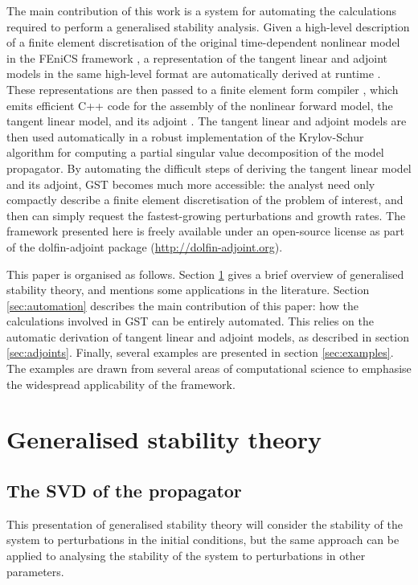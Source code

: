\documentclass{siamltex}
\begin{document}
The main contribution of this work is a system for automating the calculations required to perform
a generalised stability analysis. Given a high-level description of a finite element discretisation
of the original time-dependent nonlinear model in the FEniCS framework \cite{logg2011}, a representation of the tangent linear and adjoint
models in the same high-level format are automatically derived at runtime \cite{farrell2012b}. These representations
are then passed to a finite element form compiler \cite{kirby2006}, which emits efficient C++ code for the assembly of
the nonlinear forward model, the tangent linear model, and its adjoint \cite{logg2010a}. The tangent linear and adjoint models are then used
automatically in a robust implementation of the Krylov-Schur algorithm \cite{hernandez2005} for computing a partial singular value decomposition of the
model propagator. By automating the difficult steps of deriving the tangent linear model and its adjoint, GST becomes much more
accessible: the analyst need only compactly describe a finite element discretisation of the problem of interest, and then can simply request
the fastest-growing perturbations and growth rates. The framework presented here is freely available under an open-source
license as part of the dolfin-adjoint package (\url{http://dolfin-adjoint.org}).

This paper is organised as follows. Section \ref{sec:gst} gives a brief overview of generalised stability theory, and
mentions some applications in the literature. Section \ref{sec:automation} describes the main contribution of this paper:
how the calculations involved in GST can be entirely automated. This relies on the automatic derivation of tangent linear
and adjoint models, as described in section \ref{sec:adjoints}. Finally, several examples are presented in section
\ref{sec:examples}. The examples are drawn from several areas of computational science to emphasise the widespread
applicability of the framework.

\section{Generalised stability theory} \label{sec:gst}
\subsection{The SVD of the propagator}
This presentation of generalised stability theory will consider the stability of the system to perturbations in
the initial conditions, but the same approach can be applied to analysing the stability of the system to
perturbations in other parameters.
\end{document}
